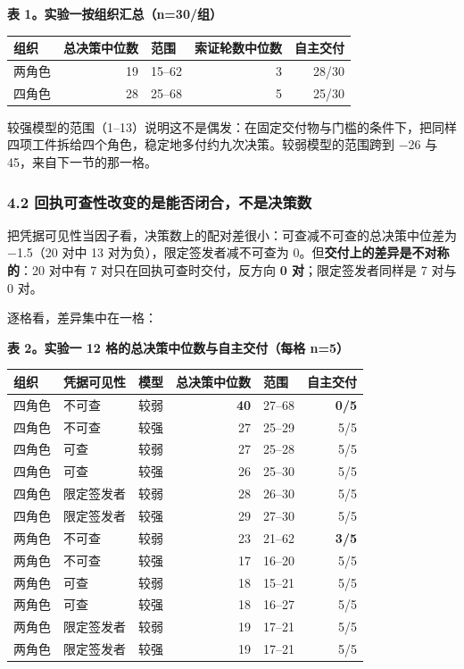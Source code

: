 \documentclass[
]{article}
\newcounter{none} %
\begin{document}
\textbf{表 1。实验一按组织汇总（n=30/组）}

{\def\LTcaptype{none} %
\begin{longtable}[]{@{}lrlrr@{}}
\toprule\noalign{}
组织 & 总决策中位数 & 范围 & 索证轮数中位数 & 自主交付 \\
\midrule\noalign{}
\endhead
\bottomrule\noalign{}
\endlastfoot
两角色 & 19 & 15--62 & 3 & 28/30 \\
四角色 & 28 & 25--68 & 5 & 25/30 \\
\end{longtable}
}

较强模型的范围（1--13）说明这不是偶发：在固定交付物与门槛的条件下，把同样四项工件拆给四个角色，稳定地多付约九次决策。较弱模型的范围跨到
−26 与 45，来自下一节的那一格。

\subsubsection{4.2
回执可查性改变的是能否闭合，不是决策数}\label{ux56deux6267ux53efux67e5ux6027ux6539ux53d8ux7684ux662fux80fdux5426ux95edux5408ux4e0dux662fux51b3ux7b56ux6570}

把凭据可见性当因子看，决策数上的配对差很小：可查减不可查的总决策中位差为
−1.5（20 对中 13 对为负），限定签发者减不可查为
0。但\textbf{交付上的差异是不对称的}：20 对中有 7
对只在回执可查时交付，反方向 \textbf{0 对}；限定签发者同样是 7 对与 0
对。

逐格看，差异集中在一格：

\textbf{表 2。实验一 12 格的总决策中位数与自主交付（每格 n=5）}

{\def\LTcaptype{none} %
\begin{longtable}[]{@{}lllrlr@{}}
\toprule\noalign{}
组织 & 凭据可见性 & 模型 & 总决策中位数 & 范围 & 自主交付 \\
\midrule\noalign{}
\endhead
\bottomrule\noalign{}
\endlastfoot
四角色 & 不可查 & 较弱 & \textbf{40} & 27--68 & \textbf{0/5} \\
四角色 & 不可查 & 较强 & 27 & 25--29 & 5/5 \\
四角色 & 可查 & 较弱 & 27 & 25--28 & 5/5 \\
四角色 & 可查 & 较强 & 26 & 25--30 & 5/5 \\
四角色 & 限定签发者 & 较弱 & 28 & 26--30 & 5/5 \\
四角色 & 限定签发者 & 较强 & 29 & 27--30 & 5/5 \\
两角色 & 不可查 & 较弱 & 23 & 21--62 & \textbf{3/5} \\
两角色 & 不可查 & 较强 & 17 & 16--20 & 5/5 \\
两角色 & 可查 & 较弱 & 18 & 15--21 & 5/5 \\
两角色 & 可查 & 较强 & 18 & 16--27 & 5/5 \\
两角色 & 限定签发者 & 较弱 & 19 & 17--21 & 5/5 \\
两角色 & 限定签发者 & 较强 & 19 & 17--21 & 5/5 \\
\end{longtable}
}
\end{document}
